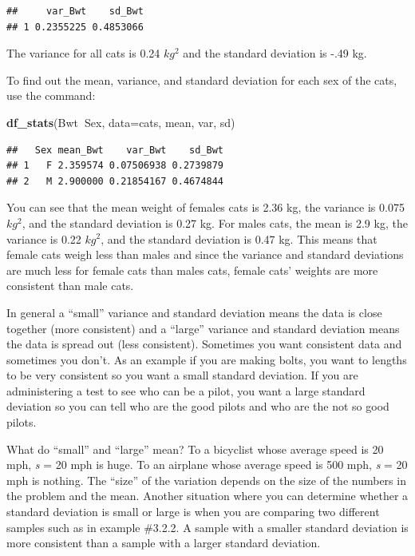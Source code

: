 \documentclass[]{book}
\newenvironment{Shaded}{\begin{snugshade}}{\end{snugshade}}
\newcommand{\DataTypeTok}[1]{\textcolor[rgb]{0.13,0.29,0.53}{#1}}
\newcommand{\KeywordTok}[1]{\textcolor[rgb]{0.13,0.29,0.53}{\textbf{#1}}}
\newcommand{\NormalTok}[1]{#1}
\newcommand{\OperatorTok}[1]{\textcolor[rgb]{0.81,0.36,0.00}{\textbf{#1}}}
\begin{document}
\begin{verbatim}
##     var_Bwt    sd_Bwt
## 1 0.2355225 0.4853066
\end{verbatim}

The variance for all cats is 0.24 \(kg^2\) and the standard deviation is -.49 kg.

To find out the mean, variance, and standard deviation for each sex of the cats, use the command:

\begin{Shaded}
\begin{Highlighting}[]
\KeywordTok{df_stats}\NormalTok{(Bwt}\OperatorTok{~}\NormalTok{Sex, }\DataTypeTok{data=}\NormalTok{cats, mean, var, sd)}
\end{Highlighting}
\end{Shaded}

\begin{verbatim}
##   Sex mean_Bwt    var_Bwt    sd_Bwt
## 1   F 2.359574 0.07506938 0.2739879
## 2   M 2.900000 0.21854167 0.4674844
\end{verbatim}

You can see that the mean weight of females cats is 2.36 kg, the variance is 0.075 \(kg^2\), and the standard deviation is 0.27 kg. For males cats, the mean is 2.9 kg, the variance is 0.22 \(kg^2\), and the standard deviation is 0.47 kg. This means that female cats weigh less than males and since the variance and standard deviations are much less for female cats than males cats, female cats' weights are more consistent than male cats.

In general a ``small'' variance and standard deviation means the data is close together
(more consistent) and a ``large'' variance and standard deviation means the data is
spread out (less consistent). Sometimes you want consistent data and
sometimes you don't. As an example if you are making bolts, you want to
lengths to be very consistent so you want a small standard deviation. If
you are administering a test to see who can be a pilot, you want a large
standard deviation so you can tell who are the good pilots and who are
the not so good pilots.

What do ``small'' and ``large'' mean? To a bicyclist whose average speed is
20 mph, \emph{s} = 20 mph is huge. To an airplane whose average speed is 500
mph, \emph{s} = 20 mph is nothing. The ``size'' of the variation depends on the
size of the numbers in the problem and the mean. Another situation where
you can determine whether a standard deviation is small or large is when
you are comparing two different samples such as in example \#3.2.2. A
sample with a smaller standard deviation is more consistent than a
sample with a larger standard deviation.
\end{document}
